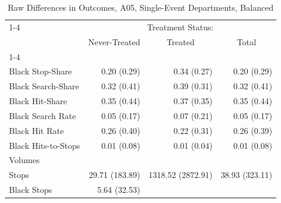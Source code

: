 \begin{table}[!h]
\caption{Raw Differences in Outcomes, A05, Single-Event Departments, Balanced}
\centering
\begin{tabular}{llll}
\cline{1-4}
\multicolumn{1}{r}{} &
  \multicolumn{3}{c}{Treatment Status:} \\
\multicolumn{1}{r}{} &
  \multicolumn{1}{c}{Never-Treated} &
  \multicolumn{1}{c}{Treated} &
  \multicolumn{1}{c}{Total} \\
\cline{1-4}
\multicolumn{1}{l}{Rates} &
  \multicolumn{1}{r}{} &
  \multicolumn{1}{r}{} &
  \multicolumn{1}{r}{} \\
\multicolumn{1}{l}{\hspace{1em}Black Stop-Share} &
  \multicolumn{1}{r}{0.20 (0.29)} &
  \multicolumn{1}{r}{0.34 (0.27)} &
  \multicolumn{1}{r}{0.20 (0.29)} \\
\multicolumn{1}{l}{\hspace{1em}Black Search-Share} &
  \multicolumn{1}{r}{0.32 (0.41)} &
  \multicolumn{1}{r}{0.39 (0.31)} &
  \multicolumn{1}{r}{0.32 (0.41)} \\
\multicolumn{1}{l}{\hspace{1em}Black Hit-Share} &
  \multicolumn{1}{r}{0.35 (0.44)} &
  \multicolumn{1}{r}{0.37 (0.35)} &
  \multicolumn{1}{r}{0.35 (0.44)} \\
\multicolumn{1}{l}{\hspace{1em}Black Search Rate} &
  \multicolumn{1}{r}{0.05 (0.17)} &
  \multicolumn{1}{r}{0.07 (0.21)} &
  \multicolumn{1}{r}{0.05 (0.17)} \\
\multicolumn{1}{l}{\hspace{1em}Black Hit Rate} &
  \multicolumn{1}{r}{0.26 (0.40)} &
  \multicolumn{1}{r}{0.22 (0.31)} &
  \multicolumn{1}{r}{0.26 (0.39)} \\
\multicolumn{1}{l}{\hspace{1em}Black Hits-to-Stops} &
  \multicolumn{1}{r}{0.01 (0.08)} &
  \multicolumn{1}{r}{0.01 (0.04)} &
  \multicolumn{1}{r}{0.01 (0.08)} \\
\multicolumn{1}{l}{Volumes} &
  \multicolumn{1}{r}{} &
  \multicolumn{1}{r}{} &
  \multicolumn{1}{r}{} \\
\multicolumn{1}{l}{\hspace{1em}Stops} &
  \multicolumn{1}{r}{29.71 (183.89)} &
  \multicolumn{1}{r}{1318.52 (2872.91)} &
  \multicolumn{1}{r}{38.93 (323.11)} \\
\multicolumn{1}{l}{\hspace{1em}Black Stops} &
  \multicolumn{1}{r}{5.64 (32.53)} &

\end{tabular}
\end{table}
